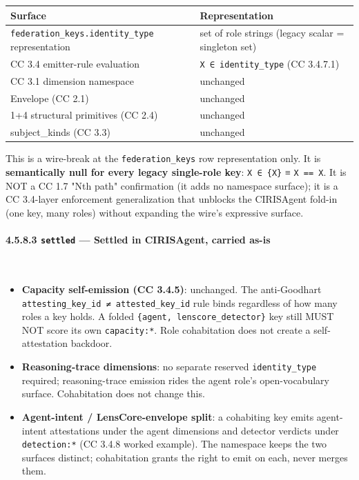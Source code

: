 \documentclass[11pt]{article}
\begin{document}
{\footnotesize
\begin{longtable}{|p{8.0cm}|p{8.0cm}|}\hline
\textbf{Surface} & \textbf{Representation} \\ \hline\endhead
\texttt{federation\_keys.identity\_type} representation & set of role strings (legacy scalar = singleton set) \\ \hline
CC 3.4 emitter-rule evaluation & \texttt{X ∈ identity\_type} (CC 3.4.7.1) \\ \hline
CC 3.1 dimension namespace & unchanged \\ \hline
Envelope (CC 2.1) & unchanged \\ \hline
1+4 structural primitives (CC 2.4) & unchanged \\ \hline
subject\_kinds (CC 3.3) & unchanged \\ \hline
\end{longtable}}


This is a wire-break at the \texttt{federation\_keys} row representation only. It is \textbf{semantically null for every legacy single-role key}: \texttt{X ∈ \{X\}} ≡ \texttt{X == X}. It is NOT a CC 1.7 "Nth path" confirmation (it adds no namespace surface); it is a CC 3.4-layer enforcement generalization that unblocks the CIRISAgent fold-in (one key, many roles) without expanding the wire's expressive surface.


\paragraph{4.5.8.3 \texttt{settled} — Settled in CIRISAgent, carried as-is}\mbox{}\\


\begin{itemize}\setlength\itemsep{0pt}
\item \textbf{Capacity self-emission (CC 3.4.5)}: unchanged. The anti-Goodhart \texttt{attesting\_key\_id ≠ attested\_key\_id} rule binds regardless of how many roles a key holds. A folded \texttt{\{agent, lenscore\_detector\}} key still MUST NOT score its own \texttt{capacity:*}. Role cohabitation does not create a self-attestation backdoor.
\item \textbf{Reasoning-trace dimensions}: no separate reserved \texttt{identity\_type} required; reasoning-trace emission rides the agent role's open-vocabulary surface. Cohabitation does not change this.
\item \textbf{Agent-intent / LensCore-envelope split}: a cohabiting key emits agent-intent attestations under the agent dimensions and detector verdicts under \texttt{detection:*} (CC 3.4.8 worked example). The namespace keeps the two surfaces distinct; cohabitation grants the right to emit on each, never merges them.
\end{itemize}
\end{document}
